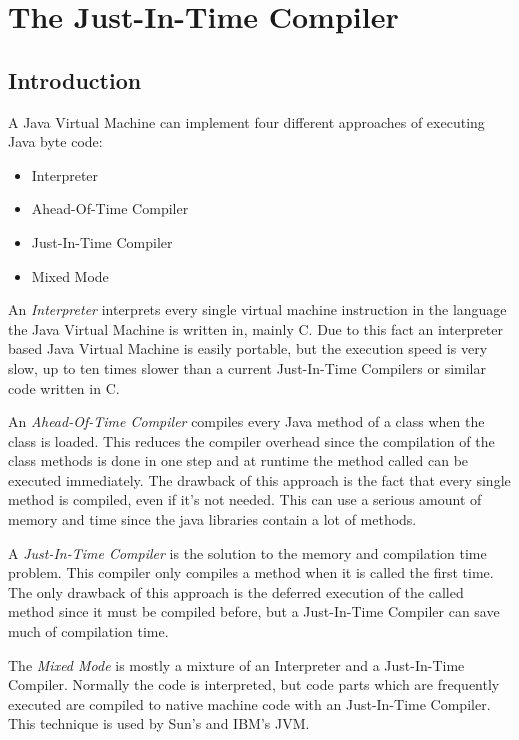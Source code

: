 \chapter{The Just-In-Time Compiler}


\section{Introduction}

A Java Virtual Machine can implement four different approaches of
executing Java byte code:

\begin{itemize}
\item Interpreter
\item Ahead-Of-Time Compiler
\item Just-In-Time Compiler
\item Mixed Mode
\end{itemize}

An \textit{Interpreter} interprets every single virtual machine
instruction in the language the Java Virtual Machine is written in,
mainly C. Due to this fact an interpreter based Java Virtual Machine
is easily portable, but the execution speed is very slow, up to ten
times slower than a current Just-In-Time Compilers or similar code
written in C.

An \textit{Ahead-Of-Time Compiler} compiles every Java method of a
class when the class is loaded. This reduces the compiler overhead
since the compilation of the class methods is done in one step and at
runtime the method called can be executed immediately. The drawback of
this approach is the fact that every single method is compiled, even
if it's not needed. This can use a serious amount of memory and time
since the java libraries contain a lot of methods.

A \textit{Just-In-Time Compiler} is the solution to the memory and
compilation time problem. This compiler only compiles a method when it
is called the first time. The only drawback of this approach is the
deferred execution of the called method since it must be compiled
before, but a Just-In-Time Compiler can save much of compilation time.

The \textit{Mixed Mode} is mostly a mixture of an Interpreter and a
Just-In-Time Compiler. Normally the code is interpreted, but code
parts which are frequently executed are compiled to native machine
code with an Just-In-Time Compiler. This technique is used by Sun's
and IBM's JVM.

